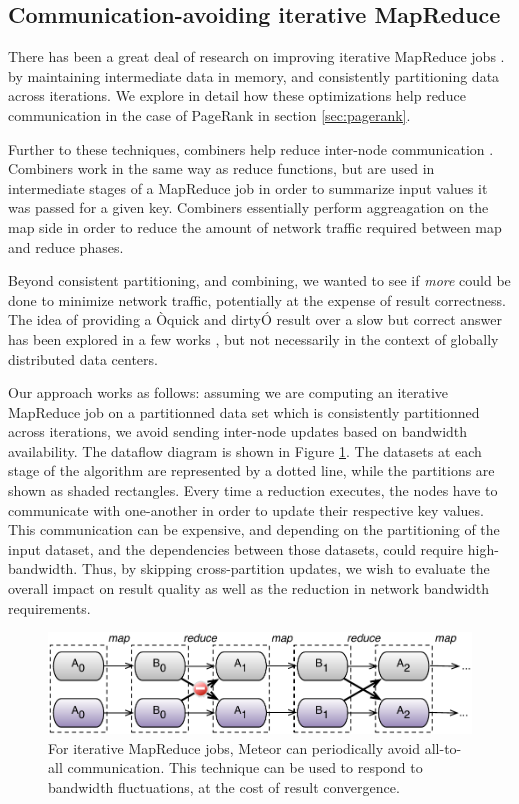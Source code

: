 \subsection{Communication-avoiding iterative MapReduce}

There has been a great deal of research on improving iterative MapReduce jobs \cite{haloop, twister, rdd}. by maintaining intermediate data in memory, and consistently partitioning data across iterations. We explore in detail how these optimizations help reduce communication in the case of PageRank in section \ref{sec:pagerank}.

Further to these techniques, combiners help reduce inter-node communication \cite{hop}. Combiners work in the same way as reduce functions, but are used in intermediate stages of a MapReduce job in order to summarize input values it was passed for a given key. Combiners essentially perform aggreagation on the map side in order to reduce the amount of network traffic required between map and reduce phases.  

Beyond consistent partitioning, and combining, we wanted to see if \emph{more} could be done to minimize network traffic, potentially at the expense of result correctness. The idea of providing a Òquick and dirtyÓ result over a slow but correct answer has been explored in a few works \cite{blinkdb, hop}, but not necessarily in the context of globally distributed data centers.

Our approach works as follows: assuming we are computing an iterative MapReduce job on a partitionned data set which is consistently partitionned across iterations, we avoid sending inter-node updates based on bandwidth availability. The dataflow diagram is shown in Figure \ref{fig:comm-avoiding}. The datasets at each stage of the algorithm are represented by a dotted line, while the partitions are shown as shaded rectangles. Every time a reduction executes, the nodes have to communicate with one-another in order to update their respective key values. This communication can be expensive, and depending on the partitioning of the input dataset, and the dependencies between those datasets, could require high-bandwidth. Thus, by skipping cross-partition updates, we wish to evaluate the overall impact on result quality as well as the reduction in network bandwidth requirements.

\begin{figure}[!ht]
\centering\includegraphics[width=0.9\columnwidth]{figs/comm_avoiding.pdf}
\caption{For iterative MapReduce jobs, Meteor can periodically avoid all-to-all communication. This technique can be used to respond to bandwidth fluctuations, at the cost of result convergence.}
\label{fig:comm-avoiding}
\vspace{.7em}
\end{figure}
